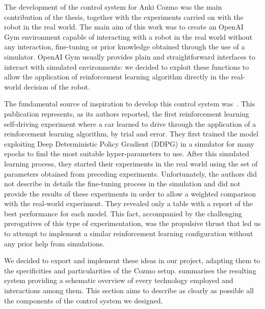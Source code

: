 The development of the control system for Anki Cozmo was the main contribution of the thesis, together with the experiments carried on with the robot in the real world.
The main aim of this work was to create an OpenAI Gym environment capable of interacting with a robot in the real world without any interaction, fine-tuning or prior knowledge obtained through the use of a simulator.
OpenAI Gym usually provides plain and straightforward interfaces to interact with simulated environments: we decided to exploit these functions to allow the application of reinforcement learning algorithm directly in the real-world decision of the robot.


The fundamental source of inspiration to develop this control system was~\cite{kendall2018learning,kendall2019learning}.
This publication represents, as its authors reported, the first reinforcement learning self-driving experiment where a car learned to drive through the application of a reinforcement learning algorithm, by trial and error.
They first trained the model exploiting Deep Deterministic Policy Gradient (DDPG) in a simulator for many epochs to find the most suitable hyper-parameters to use.
After this simulated learning process, they started their experiments in the real world using the set of parameters obtained from preceding experiments.
Unfortunately, the authors did not describe in details the fine-tuning process in the simulation and did not provide the results of these experiments in order to allow a weighted comparison with the real-world experiment.
They revealed only a  table with a report of the best performance for each model.
This fact, accompanied by the challenging prerogatives of this type of experimentation, was the propulsive thrust that led us to attempt to implement a similar reinforcement learning configuration without any prior help from simulations.

We decided to export and implement these ideas in our project, adapting them to the specificities and particularities of the Cozmo setup.
 summarises the resulting system providing a schematic overview of every technology employed and interactions among them.
This section aims to describe as clearly as possible all the components of the control system we designed.  

